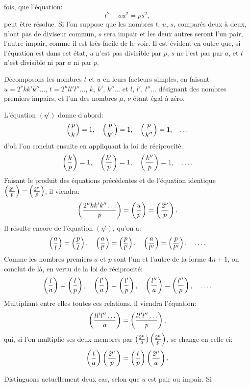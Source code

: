 \noindent
fois, que l'équation:
\begin{equation*}\tag{$\eta'$}
t^2+au^2=ps^2,
\end{equation*}
peut être résolue. Si l'on suppose que les nombres $t$, $u$, $s$, comparés deux à
deux, n'ont pas de diviseur commun, $s$ sera impair et les deux autres seront l'un
pair, l'autre impair, comme il est très facile de le voir. Il est évident en outre
que, si l'équation est dans cet état, $u$ n'est pas divisible par $p$, $s$ ne l'est pas
par $a$, et $t$ n'est divisible ni par $a$ ni par $p$.
\par\indent
Décomposons les nombres $t$ et $u$ en leurs facteurs simples, en faisant
$u=2^\nu kk'k''\ldots$, $t=2^\mu ll'l''\ldots$, $k$, $k'$, $k''\ldots$ et $l$, $l'$, $l''\ldots$ désignant des nombres
premiers impairs, et l'un des nombres $\mu$, $\nu$ étant égal à zéro.
\par\indent
L'équation $(\eta')$ donne d'abord:
\[
\left(\frac{p}{k}\right)=1,\quad\left(\frac{p}{k'}\right)=1,\quad\left(\frac{p}{k''}\right)=1,\quad\ldots
\]
d'où l'on conclut ensuite en appliquant la loi de réciprocité:
\[
\left(\frac{k}{p}\right)=1,\quad\left(\frac{k'}{p}\right)=1,\quad\left(\frac{k''}{p}\right)=1,\quad\ldots.
\]
Faisant le produit des équations précédentes et de l'équation identique $\left(\frac{2^\nu}{p}\right)=\left(\frac{2^\nu}{p}\right)$,
il viendra:
\[
\left(\frac{2^\nu kk'k''\ldots}{p}\right)=\left(\frac{u}{p}\right)=\left(\frac{2^\nu}{p}\right).
\]
Il résulte encore de l'équation $(\eta')$, qu'on a:
\[
\left(\frac{a}{l}\right)=\left(\frac{p}{l}\right),\quad\left(\frac{a}{l'}\right)=\left(\frac{p}{l'}\right),\quad
\left(\frac{a}{l''}\right)=\left(\frac{p}{l''}\right),\quad\ldots.
\]
Comme les nombres premiers $a$ et $p$ sont l'un et l'autre de la forme $4n+1$,
on conclut de là, en vertu de la loi de réciprocité:
\[
\left(\frac{l}{a}\right)=\left(\frac{l}{p}\right),\quad\left(\frac{l'}{a}\right)=\left(\frac{l'}{p}\right),\quad
\left(\frac{l''}{a}\right)=\left(\frac{l''}{p}\right),\quad\ldots.
\]
Multipliant entre elles toutes ces relations, il viendra l'équation:
\[
\left(\frac{ll'l''\ldots}{a}\right)=\left(\frac{ll'l''\ldots}{p}\right),
\]
qui, si l'on multiplie ses deux membres par $\left(\frac{2^\mu}{a}\right)\left(\frac{2^\mu}{p}\right)$, se change en celle-ci:
\[
\left(\frac{t}{a}\right)\left(\frac{2^\mu}{p}\right)=\left(\frac{t}{p}\right)\left(\frac{2^\mu}{a}\right).
\]
\par\indent
Distinguons actuellement deux cas, selon que $u$ est pair ou impair. Si
